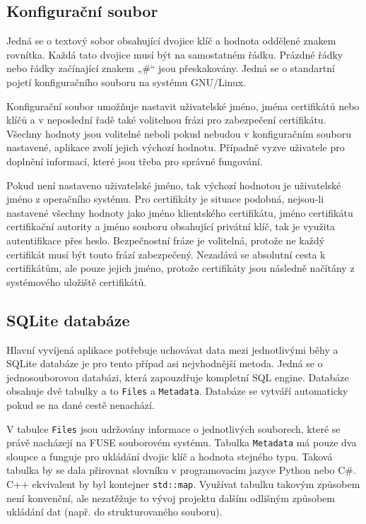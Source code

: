 \subsection{Konfigurační soubor}
\label{subsec:config}

Jedná se o textový sobor obsahující dvojice klíč a hodnota oddělené znakem rovnítka. Každá tato dvojice musí být na samostatném řádku. Prázdné řádky nebo řádky
začínající znakem „\#“ jsou přeskakovány. Jedná se o standartní pojetí konfiguračního souboru na systému GNU/Linux.

Konfigurační soubor umožňuje nastavit uživatelské jméno, jména certifikátů nebo klíčů a v neposlední řadě také volitelnou frázi pro zabezpečení certifikátu.
Všechny hodnoty jsou volitelné neboli pokud nebudou v konfiguračním souboru nastavené, aplikace zvolí jejich výchozí hodnotu. Případně vyzve uživatele pro doplnění
informací, které jsou třeba pro správné fungování.

Pokud není nastaveno uživatelské jméno, tak výchozí hodnotou je uživatelské jméno z operačního systému. Pro certifikáty je situace podobná, nejsou-li nastavené
všechny hodnoty jako jméno klientského certifikátu, jméno certifikátu certifikační autority a jméno souboru obsahující privátní klíč, tak je využita autentifikace přes
heslo. Bezpečnostní fráze je volitelná, protože ne každý certifikát musí být touto frází zabezpečený. Nezadává se absolutní cesta k certifikátům, ale pouze jejich jméno,
protože certifikáty jsou následně načítány z systémového uložiště certifikátů.

\subsection{SQLite databáze}

Hlavní vyvíjená aplikace potřebuje uchovávat data mezi jednotlivými běhy a SQLite databáze je pro tento případ asi nejvhodnější metoda. Jedná se o jednosouborovou databázi,
která zapouzdřuje kompletní SQL engine. Databáze obsahuje dvě tabulky a to \texttt{Files} a \texttt{Metadata}. Databáze se vytváří automaticky pokud se na dané cestě nenachází.

V tabulce \texttt{Files} jsou udržovány informace o jednotlivých souborech, které se právě nacházejí na FUSE souborovém systému. Tabulka \texttt{Metadata} má pouze dva
sloupce a funguje pro ukládání dvojic klíč a hodnota stejného typu. Taková tabulka by se dala přirovnat slovníku v programovacím jazyce Python nebo C\#. C++ ekvivalent by
byl kontejner \texttt{std::map}. Využívat tabulku takovým způsobem není konvenční, ale nezatěžuje to vývoj projektu dalším odlišným způsobem ukládání dat 
(např. do strukturovaného souboru).

